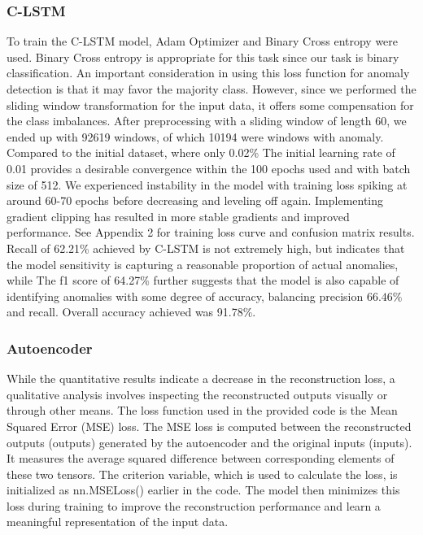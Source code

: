 \documentclass[10pt,twocolumn,letterpaper]{article}
\begin{document}
\subsubsection{C-LSTM}
To train the C-LSTM model, Adam Optimizer and Binary Cross entropy were used. Binary Cross entropy is appropriate for this task since our task is binary classification. 
An important consideration in using this loss function for anomaly detection is that it may favor the majority class. However, since we performed the sliding window 
transformation for the input data, it offers some compensation for the class imbalances. After preprocessing with a sliding window of length 60, we ended up with 
92619 windows, of which 10194 were windows with anomaly. Compared to the initial dataset, where only 0.02\% The initial learning rate of 0.01 provides a desirable 
convergence within the 100 epochs used and with batch size of 512. We experienced instability in the model with training loss spiking at around 60-70 epochs before 
decreasing and leveling off again. Implementing gradient clipping has resulted in more stable gradients and improved performance. See Appendix 2 for training loss curve 
and confusion matrix results. Recall of 62.21\% achieved by C-LSTM is not extremely high, but indicates that the model sensitivity is capturing a reasonable proportion of 
actual anomalies, while The f1 score of 64.27\%  further suggests that the model is also capable of identifying anomalies with some degree of accuracy, balancing precision 
\(66.46\%\) and recall. Overall accuracy achieved was 91.78\%. 

\subsubsection{Autoencoder}
While the quantitative results indicate a decrease in the reconstruction loss, a qualitative analysis involves inspecting the reconstructed outputs visually or through 
other means. The loss function used in the provided code is the Mean Squared Error (MSE) loss. The MSE loss is computed between the reconstructed outputs (outputs) 
generated by the autoencoder and the original inputs (inputs). It measures the average squared difference between corresponding elements of these two tensors. 
The criterion variable, which is used to calculate the loss, is initialized as nn.MSELoss() earlier in the code. The model then minimizes this loss during training to 
improve the reconstruction performance and learn a meaningful representation of the input data.
\end{document}

